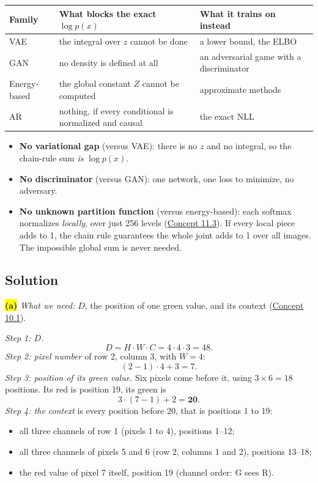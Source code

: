 \documentclass[12pt,a4paper]{article}
\begin{document}
\begin{center}
\begin{tabular}{@{}>{\raggedright\arraybackslash}p{}>{\raggedright\arraybackslash}p{}>{\raggedright\arraybackslash}p{}@{}}
\toprule
Family & What blocks the exact $\log p(x)$ & What it trains on instead \\
\midrule
VAE & the integral over $z$ cannot be done & a lower bound, the ELBO \\
GAN & no density is defined at all & an adversarial game with a discriminator \\
Energy-based & the global constant $Z$ cannot be computed & approximate methods \\
AR & nothing, if every conditional is normalized and causal & the exact NLL \\
\bottomrule
\end{tabular}
\end{center}
\begin{itemize}[nosep]
  \item \textbf{No variational gap} (versus VAE): there is no $z$ and no integral, so the chain-rule sum \emph{is} $\log p(x)$.
  \item \textbf{No discriminator} (versus GAN): one network, one loss to minimize, no adversary.
  \item \textbf{No unknown partition function} (versus energy-based): each softmax normalizes \emph{locally}, over just 256 levels (\hyperref[c11-3]{Concept 11.3}). If every local piece adds to 1, the chain rule guarantees the whole joint adds to 1 over all images. The impossible global sum is never needed.
\end{itemize}

\subsection{Solution}

\colorbox{yellow}{\textbf{(a)}} \emph{What we need:} $D$, the position of one green value, and its context (\hyperref[c10-1]{Concept 10.1}).

\emph{Step 1: $D$.}
\[
D=H\cdot W\cdot C=4\cdot4\cdot3=48 .
\]
\emph{Step 2: pixel number} of row 2, column 3, with $W=4$:
\[
(2-1)\cdot4+3=7 .
\]
\emph{Step 3: position of its green value.} Six pixels come before it, using $3\times6=18$ positions. Its red is position 19, its green is
\[
3\cdot(7-1)+2=\mathbf{20}.
\]
\emph{Step 4: the context} is every position before 20, that is positions 1 to 19:
\begin{itemize}[nosep]
  \item all three channels of row 1 (pixels 1 to 4), positions 1--12;
  \item all three channels of pixels 5 and 6 (row 2, columns 1 and 2), positions 13--18;
  \item the red value of pixel 7 itself, position 19 (channel order: G sees R).
\end{itemize}
\end{document}
